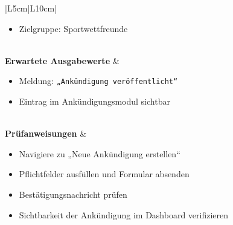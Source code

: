 \documentclass[a4paper,12pt]{article}
\begin{document}
\begin{longtable}{|L{5cm}|L{10cm}|}
\begin{minipage}[t]{\linewidth}
\begin{itemize}[leftmargin=*]
  \item Zielgruppe: Sportwettfreunde
\end{itemize}
\vspace{0.5em}
\end{minipage} \\
\hline
\textbf{Erwartete Ausgabewerte} &
\begin{minipage}[t]{\linewidth}
\vspace{0.5em}
\begin{itemize}[leftmargin=*]
  \item Meldung: \texttt{„Ankündigung veröffentlicht“}
  \item Eintrag im Ankündigungsmodul sichtbar
\end{itemize}
\vspace{0.5em}
\end{minipage} \\
\hline
\textbf{Prüfanweisungen} &
\begin{minipage}[t]{\linewidth}
\vspace{0.5em}
\begin{itemize}[leftmargin=*]
  \item Navigiere zu „Neue Ankündigung erstellen“
  \item Pflichtfelder ausfüllen und Formular absenden
  \item Bestätigungsnachricht prüfen
  \item Sichtbarkeit der Ankündigung im Dashboard verifizieren
\end{itemize}
\vspace{0.5em}
\end{minipage} \\
\hline
\end{longtable}

\vspace{1cm}
\end{document}
